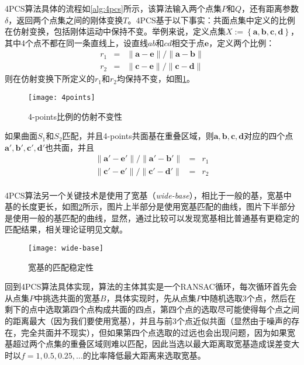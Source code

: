 4PCS算法具体的流程如\ref{alg:4pcs}所示，该算法输入两个点集$P$和$Q$，还有距离参数$\delta$，返回两个点集之间的刚体变换$T$。4PCS基于以下事实：{\kai 共面点集中定义的比例在仿射变换，包括刚体运动中保持不变。}举例来说，定义点集$X:=\left\{\mathbf{a},\mathbf{b},\mathbf{c},\mathbf{d}\right\}$，其中4个点不都在同一条直线上，设直线$ab$和$cd$相交于点$\mathbf{e}$，定义两个比例：
\begin{equation}
  \begin{array}{ccc}
    r_1& =& {\parallel \mathbf{a}-\mathbf{e}\parallel}/{\parallel \mathbf{a}-\mathbf{b}\parallel}\\
    r_2& =& {\parallel \mathbf{c}-\mathbf{e}\parallel}/{\parallel \mathbf{c}-\mathbf{d}\parallel}
  \end{array}
\end{equation}
则在仿射变换下所定义的$r_1$和$r_2$均保持不变，如图\ref{fig:4points}。
\begin{figure}[ht]
  \centering
  \texttt{[image: 4points]}
  \caption{4-points比例的仿射不变性}
  \label{fig:4points}
\end{figure}
如果曲面$S_1$和$S_2$匹配，并且4-points共面基在重叠区域，则$\mathbf{a},\mathbf{b},\mathbf{c},\mathbf{d}$对应的四个点$\mathbf{a}',\mathbf{b}',\mathbf{c}',\mathbf{d}'$也共面，并且
\begin{equation}
  \begin{array}{ccc}
    {\parallel \mathbf{a}'-\mathbf{e}'\parallel}/{\parallel \mathbf{a}'-\mathbf{b}'\parallel}&=&r_1\\
    {\parallel \mathbf{c}'-\mathbf{e}'\parallel}/{\parallel \mathbf{c}'-\mathbf{d}'\parallel}&=&r_2\\
  \end{array}
\end{equation}


4PCS算法另一个关键技术是使用了{\kai 宽基}（\emph{wide-base}），相比于一般的基，宽基中基的长度更长，如图\ref{fig:wide-base}所示，图片上半部分是使用宽基匹配的曲线，图片下半部分是使用一般的基匹配的曲线，显然，通过比较可以发现宽基相比普通基有更稳定的匹配结果，相关理论证明见文献\cite{goodrich1994practical}。
\begin{figure}[ht]
  \centering
  \texttt{[image: wide-base]}
  \caption{宽基的匹配稳定性}
  \label{fig:wide-base}
\end{figure}

回到4PCS算法具体实现，算法的主体其实是一个RANSAC循环，每次循环首先会从点集$P$中挑选共面的宽基$B$，具体实现时，先从点集$P$中随机选取3个点，然后在剩下的点中选取第四个点构成共面的四点，第四个点的选取尽可能使得每个点之间的距离最大（因为我们要使用宽基），并且与前3个点近似共面（显然由于噪声的存在，完全共面并不现实），但如果第四个点选取的过远也会出现问题，因为如果宽基超过两个点集的重叠区域则难以匹配，因此当选以最大距离取宽基造成误差变大时以$f=1,0.5,0.25,\ldots$的比率降低最大距离来选取宽基。

